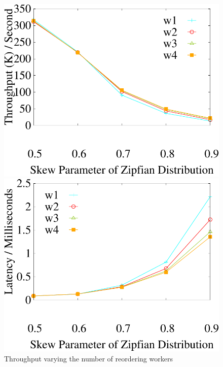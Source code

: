 \begin{figure}[!htbp]
	\centering
	\begin{minipage}[b]{0.31\linewidth}
		\centering
		\includegraphics[width=\textwidth]{./exp_fig/reorder/tps}
		\caption{Throughput varying the number of reordering workers}
		\label{fig:reorder:tps}
	\end{minipage}    
	\begin{minipage}[b]{0.31\linewidth}
		\centering
		\includegraphics[width=\textwidth]{./exp_fig/reorder/latency}

\end{minipage}
\end{figure}
